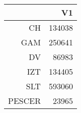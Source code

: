 \begin{table}[ht]
\centering
\begin{tabular}{rr}
  \hline
 & V1 \\ 
  \hline
CH & 134038 \\ 
  GAM & 250641 \\ 
  DV & 86983 \\ 
  IZT & 134405 \\ 
  SLT & 593060 \\ 
  PESCER & 23965 \\ 
   \hline
\end{tabular}
\end{table}
